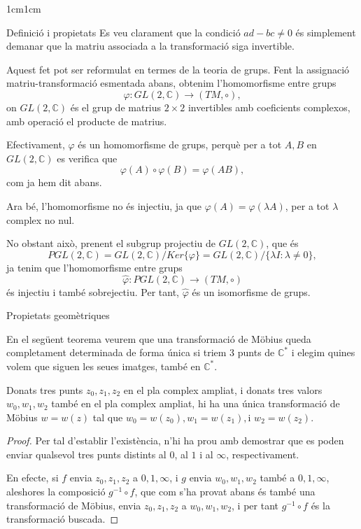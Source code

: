 \begin{adjustwidth}{1cm}{1cm}
\begin{subsection}{Definició i propietats}
    Es veu clarament que la condició $ad-bc \neq 0$ és simplement demanar que la matriu associada a la transformació siga invertible.

    Aquest fet pot ser reformulat en termes de la teoria de grups. Fent la assignació matriu-transformació esmentada abans, obtenim l'homomorfisme entre grups
    \[
        \varphi : GL(2,\mathbb{C}) \to (TM,\circ),
    \]
    on $GL(2,\mathbb{C})$ és el grup de matrius $2\times 2$ invertibles amb coeficients complexos, amb operació el producte de matrius.

    Efectivament, $\varphi$ és un homomorfisme de grups, perquè per a tot $A,B$ en $GL(2,\mathbb{C})$ es verifica que
    \[
        \varphi(A)\circ \varphi(B) = \varphi(AB),
    \]
    com ja hem dit abans.

    Ara bé, l'homomorfisme no és injectiu, ja que $\varphi(A)=\varphi(\lambda A)$, per a tot $\lambda$ complex no nul.

    No obstant això, prenent el subgrup projectiu de $GL(2,\mathbb{C})$, que és 
    \[
        PGL(2,\mathbb{C})=GL(2,\mathbb{C})/Ker\{\varphi\}=GL(2,\mathbb{C})/\{\lambda I: \lambda\neq 0\},
    \]
    ja tenim que l'homomorfisme entre grups
    \[
        \hat{\varphi} : PGL(2,\mathbb{C}) \to (TM,\circ)
    \]
    és injectiu i també sobrejectiu. Per tant, $\hat{\varphi}$ és un isomorfisme de grups.


    \end{subsection}

    \begin{subsection}{Propietats geomètriques}

    En el següent teorema veurem que una transformació de Möbius queda completament determinada de forma única si triem 3 punts de $\mathbb{C}^*$ i elegim quines volem que siguen les seues imatges, també en $\mathbb{C}^*$.

    \begin{teorema}
        Donats tres punts $z_0, z_1, z_2$ en el pla complex ampliat, i donats tres valors $w_0, w_1, w_2$ també en el pla complex ampliat, hi ha una única transformació de Möbius $w=w(z)$ tal que $w_0=w(z_0), w_1=w(z_1), \text{i } w_2=w(z_2)$.
    \end{teorema}

    \begin{proof}
        Per tal d'establir l'existència, n'hi ha prou amb demostrar que es poden enviar qualsevol tres punts distints al $0$, al $1$ i al $\infty$, respectivament.

        En efecte, si $f$ envia $z_0, z_1, z_2$ a $0,1,\infty$, i $g$ envia $w_0, w_1, w_2$ també a $0,1,\infty$, aleshores la composició $g^{-1} \circ f$, que com s'ha provat abans és també una transformació de Möbius, envia $z_0, z_1, z_2$ a $w_0, w_1, w_2$, i per tant $g^{-1}\circ f$ és la transformació buscada.
        

\end{proof}
\end{subsection}
\end{adjustwidth}
